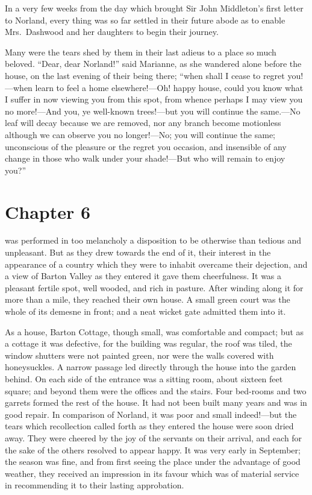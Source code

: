 In a very few weeks from the day which brought Sir
John Middleton's first letter to Norland, every thing was
so far settled in their future abode as to enable
Mrs.\ Dashwood and her daughters to begin their journey.

Many were the tears shed by them in their last
adieus to a place so much beloved.  ``Dear, dear Norland!''
said Marianne, as she wandered alone before the house,
on the last evening of their being there; ``when shall I cease
to regret you!---when learn to feel a home elsewhere!---Oh!
happy house, could you know what I suffer in now viewing
you from this spot, from whence perhaps I may view
you no more!---And you, ye well-known trees!---but you
will continue the same.---No leaf will decay because we
are removed, nor any branch become motionless although we
can observe you no longer!---No; you will continue the same;
unconscious of the pleasure or the regret you occasion,
and insensible of any change in those who walk under your
shade!---But who will remain to enjoy you?''



\chapter{Chapter 6}


 was performed in too
melancholy a disposition to be otherwise than tedious
and unpleasant.  But as they drew towards the end of it,
their interest in the appearance of a country which they
were to inhabit overcame their dejection, and a view of
Barton Valley as they entered it gave them cheerfulness.
It was a pleasant fertile spot, well wooded, and rich
in pasture.  After winding along it for more than a mile,
they reached their own house.  A small green court was
the whole of its demesne in front; and a neat wicket gate
admitted them into it.

As a house, Barton Cottage, though small, was comfortable
and compact; but as a cottage it was defective, for the
building was regular, the roof was tiled, the window
shutters were not painted green, nor were the walls covered
with honeysuckles.  A narrow passage led directly through
the house into the garden behind.  On each side of the
entrance was a sitting room, about sixteen feet square;
and beyond them were the offices and the stairs.
Four bed-rooms and two garrets formed the rest of the house.
It had not been built many years and was in good repair.
In comparison of Norland, it was poor and small indeed!---but
the tears which recollection called forth as they entered
the house were soon dried away.  They were cheered
by the joy of the servants on their arrival, and each
for the sake of the others resolved to appear happy.
It was very early in September; the season was fine,
and from first seeing the place under the advantage
of good weather, they received an impression in its
favour which was of material service in recommending
it to their lasting approbation.

